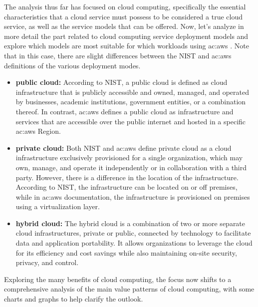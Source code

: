 The analysis thus far has focused on cloud computing, specifically the essential characteristics that a cloud service must possess to be considered a true cloud service, as well as the service models that can be offered. Now, let's analyze in more detail the part related to cloud computing service deployment models and explore which models are most suitable for which workloads using \gls{ac:aws} \cite{AWSPrivatePublicHybrid}. Note that in this case, there are slight differences between the NIST and \gls{ac:aws} definitions of the various deployment modes.
\begin{itemize}
    \item \textbf{public cloud: } According to NIST, a public cloud is defined as cloud infrastructure that is publicly accessible and owned, managed, and operated by businesses, academic institutions, government entities, or a combination thereof. In contrast, \gls{ac:aws} defines a public cloud as infrastructure and services that are accessible over the public internet and hosted in a specific \gls{ac:aws} Region.
    \item \textbf{private cloud: } Both NIST and \gls{ac:aws} define private cloud as a cloud infrastructure exclusively provisioned for a single organization, which may own, manage, and operate it independently or in collaboration with a third party. However, there is a difference in the location of the infrastructure. According to NIST, the infrastructure can be located on or off premises, while in \gls{ac:aws} documentation, the infrastructure is provisioned on premises using a virtualization layer.
    \item \textbf{hybrid cloud: } The hybrid cloud is a combination of two or more separate cloud infrastructures, private or public, connected by technology to facilitate data and application portability. It allows organizations to leverage the cloud for its efficiency and cost savings while also maintaining on-site security, privacy, and control.
\end{itemize}

Exploring the many benefits of cloud computing, the focus now shifts to a comprehensive analysis of the main value patterns of cloud computing, with some charts and graphs to help clarify the outlook.

